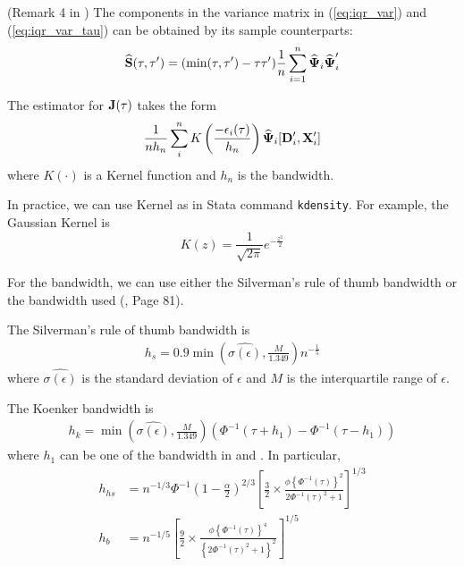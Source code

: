 \begin{remark} \label{iqr:vce} (Remark 4 in \cite{Chernozhukov2006})
The components in the variance matrix in (\ref{eq:iqr_var}) and
(\ref{eq:iqr_var_tau}) can be obtained by its sample counterparts:
\begin{align}
	\widehat{\mathbf{S}}(\tau, \tau') = (\min(\tau, \tau') - \tau \tau')
		\frac{1}{n}\sum_{i=1}^n\widehat{\boldsymbol{\Psi}}_i\widehat{\boldsymbol{\Psi}}_i'
\end{align}

The estimator for $\mathbf{J}(\tau)$ takes the form
\begin{align}
	\frac{1}{n h_n}\sum_{i}^n K\left(\frac{- \epsilon_i(\tau)}{h_n}\right)
	\widehat{\boldsymbol{\Psi}}_i[\mathbf{D}_i', \mathbf{X}_i']
\end{align}
where $K(\cdot)$ is a Kernel function and $h_n$ is the bandwidth.
\end{remark}
In practice, we can use Kernel as in Stata command {\tt kdensity}. 
For example, the Gaussian Kernel is
$$
K(z) = \frac{1}{\sqrt{2\pi}}e^{-\frac{z^2}{2}}
$$


For the bandwidth, we can use either the Silverman's rule of thumb bandwidth or
the bandwidth used \citeauthor{Koenker2005} (\citeyear{Koenker2005}, Page 81).

The Silverman's rule of thumb bandwidth is 
\begin{align}
  h_{s} = 0.9 
  \min\left(\widehat{\sigma(\epsilon)}, \frac{M}{1.349}\right) 
  n^{-\frac{1}{5}}
\end{align}
where $\widehat{\sigma(\epsilon)}$ is the standard deviation of $\epsilon$ and
$M$ is the interquartile range of $\epsilon$.

The Koenker bandwidth is 
\begin{align}
  h_{k} = 
  \min\left(\widehat{\sigma(\epsilon)}, \frac{M}{1.349}\right) 
  (\Phi^{-1}(\tau + h_1) - \Phi^{-1}(\tau - h_1))
\end{align}
where $h_1$ can be one of the bandwidth in \cite{Hall1988} and
\cite{Bofinger1975}. In particular, 
\begin{align}
	h_{hs} &= n^{-1/3}\Phi^{-1}\left(1 - \frac{\alpha}{2}\right)^{2/3}
	\left[
	\frac{3}{2}\times
	\frac{\phi\left\{\Phi^{-1}(\tau)\right\}^2}
	{2 \Phi^{-1}(\tau)^2 + 1}
\right]^{1/3}
\\
	h_{b} &= n^{-1/5}
	\left[
	\frac{9}{2}\times
	\frac{\phi\left\{\Phi^{-1}(\tau)\right\}^4}
	{\left\{2 \Phi^{-1}(\tau)^2 + 1\right\}^2}
\right]^{1/5}
\end{align}


